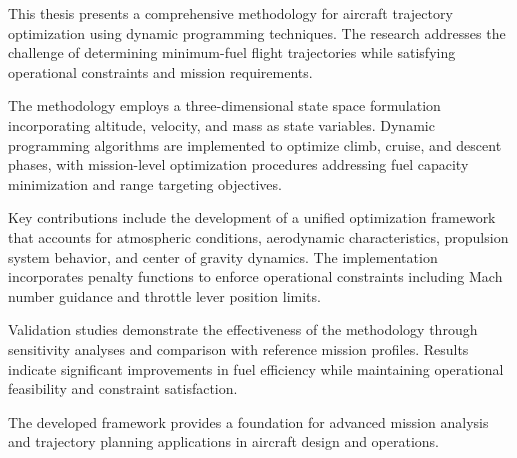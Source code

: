 
This thesis presents a comprehensive methodology for aircraft trajectory optimization using dynamic programming techniques. The research addresses the challenge of determining minimum-fuel flight trajectories while satisfying operational constraints and mission requirements.

The methodology employs a three-dimensional state space formulation incorporating altitude, velocity, and mass as state variables. Dynamic programming algorithms are implemented to optimize climb, cruise, and descent phases, with mission-level optimization procedures addressing fuel capacity minimization and range targeting objectives.

Key contributions include the development of a unified optimization framework that accounts for atmospheric conditions, aerodynamic characteristics, propulsion system behavior, and center of gravity dynamics. The implementation incorporates penalty functions to enforce operational constraints including Mach number guidance and throttle lever position limits.

Validation studies demonstrate the effectiveness of the methodology through sensitivity analyses and comparison with reference mission profiles. Results indicate significant improvements in fuel efficiency while maintaining operational feasibility and constraint satisfaction.

The developed framework provides a foundation for advanced mission analysis and trajectory planning applications in aircraft design and operations.

